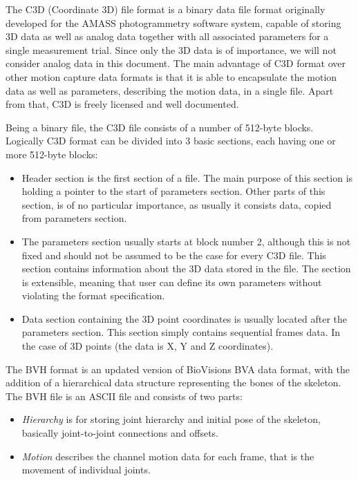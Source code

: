\documentclass[times, 10pt,twocolumn]{article}
\begin{document}
The C3D (Coordinate 3D) file format is a binary data file format originally developed for the AMASS photogrammetry software system, capable of storing 3D data as well as analog data together with all associated parameters for a single measurement trial. Since only the 3D data is of importance, we will not consider analog data in this document. The main advantage of C3D format over other motion capture data formats is that it is able to encapsulate the motion data as well as parameters, describing the  motion data, in a single file. Apart from that, C3D is freely licensed and well documented.

Being a binary file, the C3D file consists of a number of 512-byte blocks. Logically C3D format can be divided into 3 basic sections, each having one or more 512-byte blocks:
\begin{itemize}
\item Header section is the first section of a file. The main purpose of this section is holding a pointer to the start of parameters section. Other parts of this section, is of no particular importance, as usually it consists data, copied from parameters section.

\item The parameters section usually starts at block number 2, although this is not fixed and should not be assumed to be the case for every C3D file. This section contains information about the 3D data stored in the file. The section is extensible, meaning that user can define its own parameters without  violating the format specification.

\item Data section containing the 3D point coordinates is usually located after the parameters section. This section simply contains sequential frames data. In the case of 3D points (the data is X, Y and Z coordinates).
\end{itemize}

\label{bvh_description}
The BVH format is an updated version of BioVisions BVA data format, with the addition of a
hierarchical data structure representing the bones of the skeleton.
The BVH file is an ASCII file and consists of two parts:

\begin{itemize}
\item \emph{Hierarchy} is for storing joint hierarchy and initial pose of the skeleton,
basically joint-to-joint connections and offsets.
\item \emph{Motion} describes the channel motion data for each frame,
that is the movement of individual joints.
\end{itemize}
\end{document}
